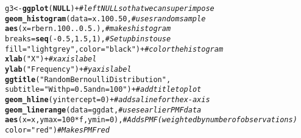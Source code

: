 \documentclass{article}\usepackage[]{graphicx}\usepackage[]{color}
\makeatletter
\newcommand{\hlnum}[1]{\textcolor[rgb]{0.686,0.059,0.569}{#1}}%
\newcommand{\hlstr}[1]{\textcolor[rgb]{0.192,0.494,0.8}{#1}}%
\newcommand{\hlcom}[1]{\textcolor[rgb]{0.678,0.584,0.686}{\textit{#1}}}%
\newcommand{\hlopt}[1]{\textcolor[rgb]{0,0,0}{#1}}%
\newcommand{\hlstd}[1]{\textcolor[rgb]{0.345,0.345,0.345}{#1}}%
\newcommand{\hlkwa}[1]{\textcolor[rgb]{0.161,0.373,0.58}{\textbf{#1}}}%
\newcommand{\hlkwb}[1]{\textcolor[rgb]{0.69,0.353,0.396}{#1}}%
\newcommand{\hlkwc}[1]{\textcolor[rgb]{0.333,0.667,0.333}{#1}}%
\newcommand{\hlkwd}[1]{\textcolor[rgb]{0.737,0.353,0.396}{\textbf{#1}}}%
\newenvironment{kframe}{%
 \def\at@end@of@kframe{}%
 \ifinner\ifhmode%
  \def\at@end@of@kframe{\end{minipage}}%
  \begin{minipage}{\columnwidth}%
 \fi\fi%
 \def\FrameCommand##1{\hskip\@totalleftmargin \hskip-\fboxsep
 \colorbox{shadecolor}{##1}\hskip-\fboxsep
     \hskip-\linewidth \hskip-\@totalleftmargin \hskip\columnwidth}%
 \MakeFramed {\advance\hsize-\width
   \@totalleftmargin\z@ \linewidth\hsize
   \@setminipage}}%
 {\par\unskip\endMakeFramed%
 \at@end@of@kframe}
\newenvironment{knitrout}{}{} %
\makeatother
\begin{document}
\begin{enumerate}
\begin{knitrout}
\begin{kframe}
\begin{alltt}
\hlstd{g3}\hlkwb{<-}\hlkwd{ggplot}\hlstd{(}\hlkwa{NULL}\hlstd{)} \hlopt{+}                                      \hlcom{#left NULL so that we can superimpose}
  \hlkwd{geom_histogram}\hlstd{(}\hlkwc{data}\hlstd{=x.100.50,}                         \hlcom{#uses random sample}
                 \hlkwd{aes}\hlstd{(}\hlkwc{x}\hlstd{=rbern.100..0.5.),}                \hlcom{#makes histogram}
                 \hlkwc{breaks}\hlstd{=}\hlkwd{seq}\hlstd{(}\hlopt{-}\hlnum{0.5}\hlstd{,}\hlnum{1.5}\hlstd{,}\hlnum{1}\hlstd{),}                \hlcom{#Set up bins to use}
                 \hlkwc{fill} \hlstd{=} \hlstr{"lightgrey"}\hlstd{,} \hlkwc{color}\hlstd{=}\hlstr{"black"}\hlstd{)} \hlopt{+}   \hlcom{#color the histogram}
  \hlkwd{xlab}\hlstd{(}\hlstr{"X"}\hlstd{)} \hlopt{+}                                           \hlcom{#x axis label}
  \hlkwd{ylab}\hlstd{(}\hlstr{"Frequency"}\hlstd{)}\hlopt{+}                                    \hlcom{#y axis label}
  \hlkwd{ggtitle}\hlstd{(}\hlstr{"Random Bernoulli Distribution"}\hlstd{,}
          \hlkwc{subtitle} \hlstd{=} \hlstr{"With p=0.5 and n=100"}\hlstd{)} \hlopt{+}          \hlcom{#add title to plot}
  \hlkwd{geom_hline}\hlstd{(}\hlkwc{yintercept}\hlstd{=}\hlnum{0}\hlstd{)} \hlopt{+}                            \hlcom{#adds a line for the x-axis}
  \hlkwd{geom_linerange}\hlstd{(}\hlkwc{data}\hlstd{=ggdat,}                            \hlcom{#uses earlier PMF data}
                 \hlkwd{aes}\hlstd{(}\hlkwc{x}\hlstd{=x,} \hlkwc{ymax}\hlstd{=}\hlnum{100}\hlopt{*}\hlstd{f,} \hlkwc{ymin}\hlstd{=}\hlnum{0}\hlstd{),}          \hlcom{#Adds PMF (weighted by number of observations)}
                 \hlkwc{color}\hlstd{=}\hlstr{"red"}\hlstd{)}                           \hlcom{#Makes PMF red}



\end{alltt}
\end{kframe}
\end{knitrout}
\end{enumerate}
\end{document}
